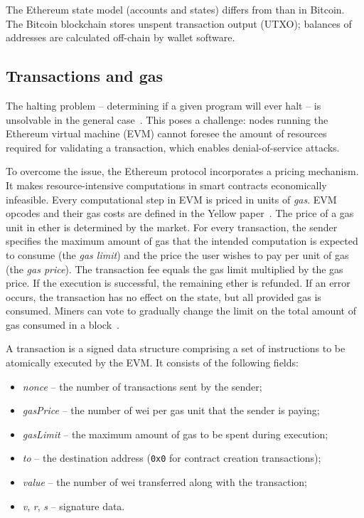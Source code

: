 The Ethereum state model (accounts and states) differs from than in Bitcoin.
The Bitcoin blockchain stores unspent transaction output (UTXO); balances of addresses are calculated off-chain by wallet software.


\subsection{Transactions and gas}

The halting problem -- determining if a given program will ever halt -- is unsolvable in the general case~\cite{Church1936}.
This poses a challenge: nodes running the Ethereum virtual machine (EVM) cannot foresee the amount of resources required for validating a transaction, which enables denial-of-service attacks.

To overcome the issue, the Ethereum protocol incorporates a pricing mechanism.
It makes resource-intensive computations in smart contracts economically infeasible.
Every computational step in EVM is priced in units of \emph{gas}.
EVM opcodes and their gas costs are defined in the Yellow paper~\cite{Wood2014}.
The price of a gas unit in ether is determined by the market.
For every transaction, the sender specifies the maximum amount of gas that the intended computation is expected to consume (the \emph{gas limit}) and the price the user wishes to pay per unit of gas (the \emph{gas price}).
The transaction fee equals the gas limit multiplied by the gas price.
If the execution is successful, the remaining ether is refunded.
If an error occurs, the transaction has no effect on the state, but all provided gas is consumed.
Miners can vote to gradually change the limit on the total amount of gas consumed in a block~\cite{Jnnk15}.

A transaction is a signed data structure comprising a set of instructions to be atomically executed by the EVM.
It consists of the following fields:
\begin{itemize}
	\item \emph{nonce} -- the number of transactions sent by the sender;
	\item \emph{gasPrice} -- the number of wei per gas unit that the sender is paying;
	\item \emph{gasLimit} -- the maximum amount of gas to be spent during execution;
	\item \emph{to} -- the destination address (\texttt{0x0} for contract creation transactions);
	\item \emph{value} -- the number of wei transferred along with the transaction;
	\item \emph{v}, \emph{r}, \emph{s} -- signature data.
\end{itemize}

